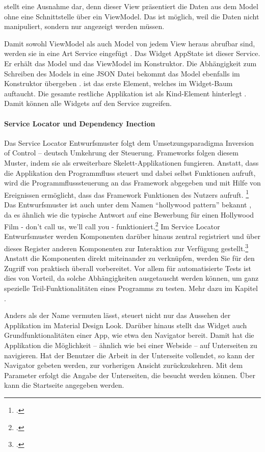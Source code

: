   stellt eine Ausnahme dar, denn dieser View präsentiert die Daten aus dem Model ohne eine Schnittstelle über ein ViewModel. Das ist möglich, weil die Daten nicht manipuliert, sondern nur angezeigt werden müssen.

Damit sowohl ViewModel als auch Model von jedem View heraus abrufbar sind, werden sie in eine Art Service eingefügt . Das Widget AppState ist dieser Service.  Er erhält das Model  und das ViewModel   im Konstruktor. Die Abhängigkeit zum Schreiben des Models in eine JSON Datei  bekommt das Model ebenfalls im Konstruktor übergeben .
 ist das erste Element, welches im Widget-Baum auftaucht. Die gesamte restliche Applikation ist als Kind-Element hinterlegt . Damit können alle Widgets auf den Service zugreifen. 


\paragraph{Service Locator und Dependency Inection}

Das Service Locator Entwurfsmuster folgt dem Umsetzungsparadigma Inversion of Control – deutsch Umkehrung der Steuerung. Frameworks folgen diesem Muster, indem sie als erweiterbare Skelett-Applikationen fungieren. Anstatt, dass die Applikation den Programmfluss steuert und dabei selbst Funktionen aufruft, wird die Programmflusssteuerung an das Framework abgegeben und mit Hilfe von Ereignissen ermöglicht, dass das Framework Funktionen des Nutzers aufruft. \footcite[Vgl.][]{johnson1988designing}
Das Entwurfsmuster ist auch unter dem Namen \enquote{hollywood pattern} bekannt , da es ähnlich wie die typische Antwort auf eine Bewerbung für einen Hollywood Film - don’t call us, we’ll call you - funktioniert.\footcite[Vgl.][]{fowler2005InversionOfControl}
Im Service Locator Entwurfsmuster werden Komponenten darüber hinaus zentral registriert und über dieses Register anderen Komponenten zur Interaktion zur Verfügung gestellt.\footcite[Vgl.][]{fowler2004DependencyInjection}
Anstatt die Komponenten direkt miteinander zu verknüpfen, werden Sie für den Zugriff von praktisch überall vorbereitet. Vor allem für automatisierte Tests ist dies von Vorteil, da solche Abhängigkeiten ausgetauscht werden können, um ganz spezielle Teil-Funktionalitäten eines Programms zu testen.  Mehr dazu im Kapitel .


Anders als der Name vermuten lässt, steuert  nicht nur das Aussehen der Applikation im Material Design Look. Darüber hinaus stellt das Widget auch Grundfunktionalitäten einer App, wie etwa den Navigator bereit. Damit hat die Applikation die Möglichkeit – ähnlich wie bei einer Webside – auf Unterseiten zu navigieren. Hat der Benutzer die Arbeit in der Unterseite vollendet, so kann der Navigator gebeten werden, zur vorherigen Ansicht zurückzukehren.  Mit dem Parameter   erfolgt die Angabe der Unterseiten, die besucht werden können.
Über   kann die Startseite angegeben werden.

